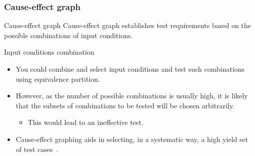 \begin{frame}[parent={concept:functional-testing}, hasprev=false, hasnext=true]
\frametitle{Cause-effect graph}
\label{concept:case-effect-graph}

\begin{block:concept}{Cause-effect graph}
Cause-effect graph establishes test requirements based on the possible
combinations of input conditions.
\end{block:concept}


\begin{block:fact}{Input conditions combination}
\begin{itemize}
	\item You could combine and select input conditions and test such
	combinations using equivalence partition.

	\item However, as the number of possible combinations is usually high,
	it is likely that the subsets of combinations to be tested will be chosen
	arbitrarily.
	\begin{itemize}
		\item This would lead to an ineffective test.
	\end{itemize}

	\item Cause-effect graphing aids in selecting, in a systematic way,
	a high yield set of test cases~\cite[p.~66]{Myers:2004}.
\end{itemize}
\end{block:fact}
\end{frame}


